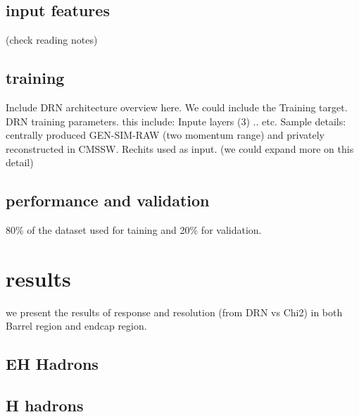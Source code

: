 \subsection{input features}
(check reading notes)

\subsection{training}
Include DRN architecture overview here. We could include the Training target.
DRN training parameters. this include: Inpute layers (3) .. etc.
Sample details: centrally produced GEN-SIM-RAW (two momentum range) and privately reconstructed in CMSSW.
Rechits used as input. (we could expand more on this detail)

\subsection{performance and validation}
80\% of the dataset used for taining and 20\% for validation.

\section{results}
we present the results of response and resolution (from DRN vs Chi2) in  both Barrel region and endcap region.
\subsection{EH Hadrons}
\subsection{H hadrons}
